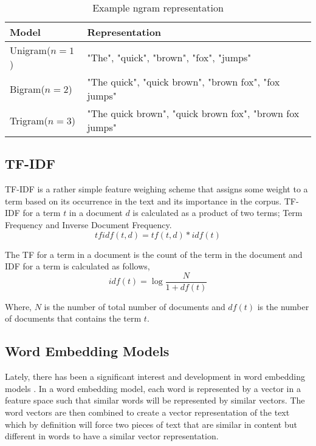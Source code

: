 \begin{table}[h]
\begin{center}
\caption{Example ngram representation}
\label{tbl:ngram_representation}
\begin{tabular}{p{3cm}p{8cm}}
\toprule 
Model&Representation\\
\midrule 
Unigram($n=1$)&"The", "quick", "brown", "fox", "jumps" \\
Bigram($n=2$)&"The quick", "quick brown", "brown fox", "fox jumps" \\
Trigram($n=3$)& "The quick brown", "quick brown fox", "brown fox jumps" \\
\bottomrule
\end{tabular}
\end{center}
\end{table}

\subsection{TF-IDF}
TF-IDF\cite{sparck1972statistical} is a rather simple feature weighing scheme that assigns some weight to a term based on its occurrence in the text and its importance in the corpus. TF-IDF for a term $t$ in a document $d$ is calculated as a product of two terms; Term Frequency and Inverse Document Frequency. 
\begin{equation}
    \label{eq:tf_idf_equation}
    tfidf(t, d) = tf(t, d) * idf(t)
\end{equation}

The TF for a term in a document is the count of the term in the document and IDF for a term is calculated as follows,
\begin{equation}
    \label{eq:idf_equation}
    idf(t) = \log{\frac{N}{1 + df(t)}}
\end{equation}

Where, $N$ is the number of total number of documents and $df(t)$ is the number of documents that contains the term $t$.

\subsection{Word Embedding Models}
Lately, there has been a significant interest and development in word embedding models \cite{mikolov2013distributed, pennington2014glove, bojanowski2017enriching}. In a word embedding model, each word is represented by a vector in a feature space such that similar words will be represented by similar vectors\cite{goldberg2014word2vec}. The word vectors are then combined to create a vector representation of the text which by definition will force two pieces of text that are similar in content but different in words to have a similar vector representation.


